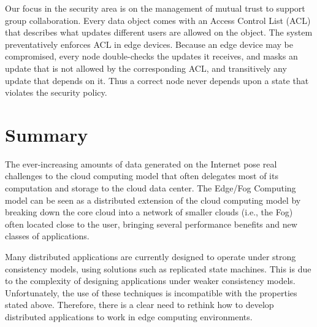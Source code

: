 Our focus in the security area is on the management of mutual trust to
support group collaboration.
Every data object comes with an Access Control List (ACL) that describes
what updates different users are allowed on the object.
The system preventatively enforces ACL in edge devices.
Because an edge device may be compromised, every node double-checks the
updates it receives, and masks an update that is not allowed by the
corresponding ACL, and transitively any update that depends on it.
Thus a correct node never depends upon a state that violates the security
policy.

\section{Summary}
The ever-increasing amounts of data generated on the Internet pose real challenges to the cloud computing model that often delegates most of its computation and storage to the cloud data center. The Edge/Fog Computing model can be seen as a distributed extension of the cloud computing model by breaking down the core cloud into a network of smaller clouds (i.e., the Fog) often located close to the user, bringing several performance benefits and new classes of applications.

Many distributed applications are currently designed to operate under strong consistency models, using solutions such as replicated state machines. This is due to the complexity of designing applications under weaker consistency models. Unfortunately, the use of these techniques is incompatible with the properties stated above. Therefore, there is a clear need to rethink how to develop distributed applications to work in edge computing environments.
